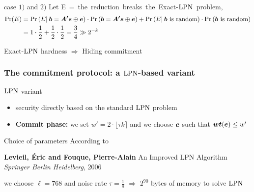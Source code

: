 \begin{frame}

  \begin{center}
  \end{center}

  \begin{block}{case $1)$ and $2)$ }
  Let \mbox{E = {the reduction breaks the Exact-$\mathrm{LPN}$ problem}},  
  \begin{align*}
    \Pr(E) &= \Pr \left( E | \:\boldsymbol{b}  = \boldsymbol{A'} \boldsymbol{s} \mathbin{\oplus} \boldsymbol{e}  \right)  \cdot  \Pr \left( \boldsymbol{b}  = \boldsymbol{A'} \boldsymbol{s} \mathbin{\oplus} \boldsymbol{e}  \right)  + \Pr \left( E   | \: \boldsymbol{b} \text{ is random}  \right)   \cdot \Pr \left(   \boldsymbol{b} \text{ is random} \right) \\
	  &=  1  \cdot   \frac{1}{2}  +  \frac{1}{2}  \cdot  \frac{1}{2} = \frac{3}{4} \gg 2^{-k}
  \end{align*}
  \begin{center}   
      \centering Exact-$\mathrm{LPN}$ hardness $\Rightarrow$ Hiding commitment
  \end{center}
  \end{block}

\end{frame}

\begin{frame}
\frametitle{The commitment protocol: a $\mathrm{LPN}$-based variant}
\begin{block}{$\mathrm{LPN}$ variant}
\begin{itemize}
 \item security directly based on the standard $\mathrm{LPN}$ problem
 \item \textbf{Commit phase:} we set $w'= 2 \cdot \lfloor\tau k\rceil$ and we choose $\boldsymbol{e}$ such that $\boldsymbol{wt}(\boldsymbol{e}) \leq w'$
 \end{itemize}

\end{block}


\begin{block}{Choice of parameters}
According to
\begin{center}
\begin{thebibliography}{XX}
   			 \textbf{Levieil, \'Eric and Fouque, Pierre-Alain}
  			 \newblock An Improved LPN Algorithm
   				\newblock \emph{Springer Berlin Heidelberg}, 2006
			\end{thebibliography} 
\end{center}

we choose $\ell=768$ and noise rate $\tau = \frac{1}{8}$ $\Rightarrow$ $2^{90}$ bytes of memory to solve $\mathrm{LPN}$
\end{block}

\end{frame}
 
